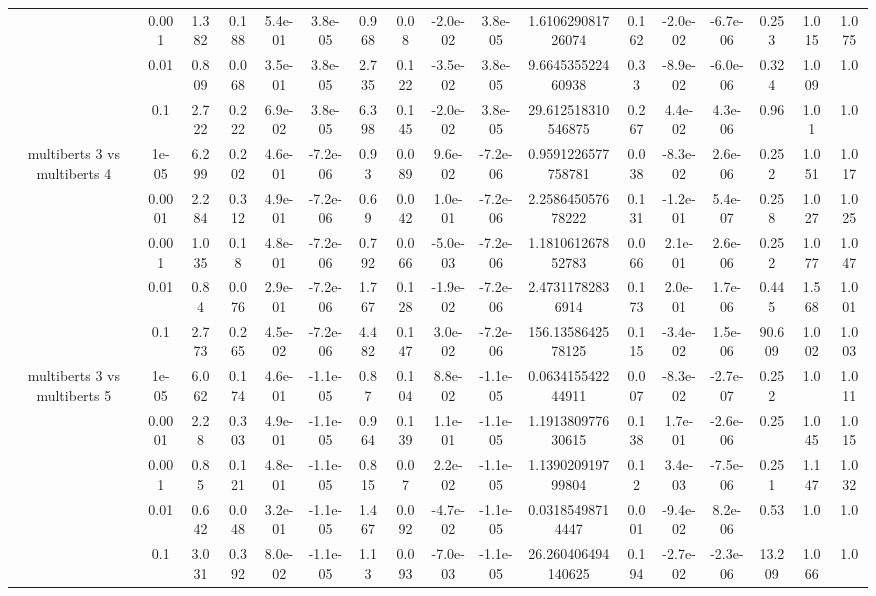 \begin{tabular}{|c|c|c|c|c|c|c|c|c|c|c|c|c|c|c|c|c|}
 & 0.001 & 1.382 & 0.188 & 5.4e-01 & 3.8e-05 & 0.968 & 0.08 & -2.0e-02 & 3.8e-05 & 1.610629081726074 & 0.162 & -2.0e-02 & -6.7e-06 & 0.253 & 1.015 & 1.075 \\
 & 0.01 & 0.809 & 0.068 & 3.5e-01 & 3.8e-05 & 2.735 & 0.122 & -3.5e-02 & 3.8e-05 & 9.664535522460938 & 0.33 & -8.9e-02 & -6.0e-06 & 0.324 & 1.009 & 1.0 \\
 & 0.1 & 2.722 & 0.222 & 6.9e-02 & 3.8e-05 & 6.398 & 0.145 & -2.0e-02 & 3.8e-05 & 29.612518310546875 & 0.267 & 4.4e-02 & 4.3e-06 & 0.96 & 1.01 & 1.0 \\
\hline
\multirow{5}{*}{multiberts 3 vs multiberts 4} & 1e-05 & 6.299 & 0.202 & 4.6e-01 & -7.2e-06 & 0.93 & 0.089 & 9.6e-02 & -7.2e-06 & 0.9591226577758781 & 0.038 & -8.3e-02 & 2.6e-06 & 0.252 & 1.051 & 1.017 \\
 & 0.0001 & 2.284 & 0.312 & 4.9e-01 & -7.2e-06 & 0.69 & 0.042 & 1.0e-01 & -7.2e-06 & 2.258645057678222 & 0.131 & -1.2e-01 & 5.4e-07 & 0.258 & 1.027 & 1.025 \\
 & 0.001 & 1.035 & 0.18 & 4.8e-01 & -7.2e-06 & 0.792 & 0.066 & -5.0e-03 & -7.2e-06 & 1.181061267852783 & 0.066 & 2.1e-01 & 2.6e-06 & 0.252 & 1.077 & 1.047 \\
 & 0.01 & 0.84 & 0.076 & 2.9e-01 & -7.2e-06 & 1.767 & 0.128 & -1.9e-02 & -7.2e-06 & 2.47311782836914 & 0.173 & 2.0e-01 & 1.7e-06 & 0.445 & 1.568 & 1.001 \\
 & 0.1 & 2.773 & 0.265 & 4.5e-02 & -7.2e-06 & 4.482 & 0.147 & 3.0e-02 & -7.2e-06 & 156.1358642578125 & 0.115 & -3.4e-02 & 1.5e-06 & 90.609 & 1.002 & 1.003 \\
\hline
\multirow{5}{*}{multiberts 3 vs multiberts 5} & 1e-05 & 6.062 & 0.174 & 4.6e-01 & -1.1e-05 & 0.87 & 0.104 & 8.8e-02 & -1.1e-05 & 0.063415542244911 & 0.007 & -8.3e-02 & -2.7e-07 & 0.252 & 1.0 & 1.011 \\
 & 0.0001 & 2.28 & 0.303 & 4.9e-01 & -1.1e-05 & 0.964 & 0.139 & 1.1e-01 & -1.1e-05 & 1.191380977630615 & 0.138 & 1.7e-01 & -2.6e-06 & 0.25 & 1.045 & 1.015 \\
 & 0.001 & 0.85 & 0.121 & 4.8e-01 & -1.1e-05 & 0.815 & 0.07 & 2.2e-02 & -1.1e-05 & 1.139020919799804 & 0.12 & 3.4e-03 & -7.5e-06 & 0.251 & 1.147 & 1.032 \\
 & 0.01 & 0.642 & 0.048 & 3.2e-01 & -1.1e-05 & 1.467 & 0.092 & -4.7e-02 & -1.1e-05 & 0.03185498714447 & 0.001 & -9.4e-02 & 8.2e-06 & 0.53 & 1.0 & 1.0 \\
 & 0.1 & 3.031 & 0.392 & 8.0e-02 & -1.1e-05 & 1.13 & 0.093 & -7.0e-03 & -1.1e-05 & 26.260406494140625 & 0.194 & -2.7e-02 & -2.3e-06 & 13.209 & 1.066 & 1.0 \\

\end{tabular}
